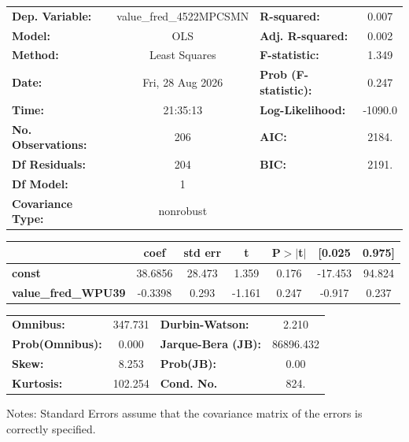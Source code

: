 \begin{center}
\begin{tabular}{lclc}
\toprule
\textbf{Dep. Variable:}     & value\_fred\_4522MPCSMN & \textbf{  R-squared:         } &     0.007   \\
\textbf{Model:}             &           OLS           & \textbf{  Adj. R-squared:    } &     0.002   \\
\textbf{Method:}            &      Least Squares      & \textbf{  F-statistic:       } &     1.349   \\
\textbf{Date:}              &     Fri, 28 Aug 2026    & \textbf{  Prob (F-statistic):} &    0.247    \\
\textbf{Time:}              &         21:35:13        & \textbf{  Log-Likelihood:    } &   -1090.0   \\
\textbf{No. Observations:}  &             206         & \textbf{  AIC:               } &     2184.   \\
\textbf{Df Residuals:}      &             204         & \textbf{  BIC:               } &     2191.   \\
\textbf{Df Model:}          &               1         & \textbf{                     } &             \\
\textbf{Covariance Type:}   &        nonrobust        & \textbf{                     } &             \\
\bottomrule
\end{tabular}
\begin{tabular}{lcccccc}
                            & \textbf{coef} & \textbf{std err} & \textbf{t} & \textbf{P$> |$t$|$} & \textbf{[0.025} & \textbf{0.975]}  \\
\midrule
\textbf{const}              &      38.6856  &       28.473     &     1.359  &         0.176        &      -17.453    &       94.824     \\
\textbf{value\_fred\_WPU39} &      -0.3398  &        0.293     &    -1.161  &         0.247        &       -0.917    &        0.237     \\
\bottomrule
\end{tabular}
\begin{tabular}{lclc}
\textbf{Omnibus:}       & 347.731 & \textbf{  Durbin-Watson:     } &     2.210  \\
\textbf{Prob(Omnibus):} &   0.000 & \textbf{  Jarque-Bera (JB):  } & 86896.432  \\
\textbf{Skew:}          &   8.253 & \textbf{  Prob(JB):          } &      0.00  \\
\textbf{Kurtosis:}      & 102.254 & \textbf{  Cond. No.          } &      824.  \\
\bottomrule
\end{tabular}
\end{center}

Notes: \newline
 [1] Standard Errors assume that the covariance matrix of the errors is correctly specified.